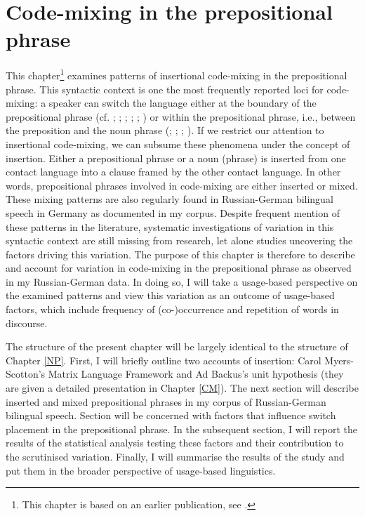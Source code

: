 \chapter{Code-mixing in the prepositional phrase}\label{PP}

This chapter\footnote{This chapter is based on an earlier publication, see \citet{reif-robinson}.} examines patterns of insertional code-mixing in the prepositional phrase. This syntactic context is one the most frequently reported loci for code-mixing: a speaker can switch the language either at the boundary of the prepositional phrase (cf. \citealt[314]{bentahila-davies-1983}; \citealt[271, 315]{boumans-syntax-1998}; \citealt[757]{clyne1987}; \citealt[169]{haust-codeswitching-1995}; \citealt[310]{pfaff-1979}; \citealt[208, 221--224]{treffers-daller-mixing-1994}) or within the prepositional phrase, i.e., between the preposition and the noun phrase (\citealt[315]{bentahila-davies-1983}; \citealt[602]{poplack-sometimes-1980}; \citealt[310]{pfaff-1979}; \citealt[173, 178]{stenson-1990}). If we restrict our attention to insertional code-mixing, we can subsume these phenomena under the concept of insertion. Either a prepositional phrase or a noun (phrase) is inserted from one contact language into a clause framed by the other contact language. In other words, prepositional phrases involved in code-mixing are either inserted or mixed. These mixing patterns are also regularly found in Russian-German bilingual speech in Germany as documented in my corpus. Despite frequent mention of these patterns in the literature, systematic investigations of  variation in this syntactic context are still missing from research, let alone studies uncovering the factors driving this variation. The purpose of this chapter is therefore to describe and account for variation in code-mixing in the prepositional phrase as observed in my Russian-German data. In doing so, I will take a usage-based perspective on the examined patterns and view this variation as an outcome of usage-based factors, which include frequency of (co-)occurrence and repetition of words in discourse.

The structure of the present chapter will be largely identical to the structure of Chapter \ref{NP}. First, I will briefly outline two accounts of insertion: Carol Myers-Scotton's Matrix Language Framework and Ad Backus's unit hypothesis (they are given a detailed presentation in Chapter \ref{CM}). The next section will describe inserted and mixed prepositional phrases in my corpus of Russian-German bilingual speech. Section  will be concerned with factors that influence switch placement in the prepositional phrase. In the subsequent section, I will report the results of the statistical analysis testing these factors and their contribution to the scrutinised variation. Finally, I will summarise the results of the study and put them in the broader perspective of usage-based linguistics.

